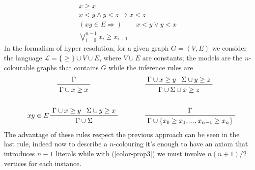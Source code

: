 \documentclass[a4paper,12pt,oneside]{book}
\let\o\vee
\let\e\wedge
\begin{document}
\begin{gather}
x\geq x\\
x<y \e y<z \rightarrow x<z \\
( xy \in E \Rightarrow ) \qquad  x<y \o y<x\\
\bigvee_{i=0}^{n-1} x_i\geq x_{i+1}
\end{gather}
In the formalism of hyper resolution, for a given graph $G=(V,E)$ we consider the language $\mathscr{L}=\{\geq\}\cup V\cup E$, where $V\cup E$ are constants; the models are the $n$-colourable graphs that contains $G$ while the inference rules are
\begin{align*}
\prftree{\Gamma}{\Gamma \cup x\geq x }\qquad \qquad\qquad
& \qquad\prftree{\Gamma\cup x\geq y}{ \Sigma\cup y\geq z }{\Gamma\cup\Sigma\cup x\geq z } \\
\,&\,\\
\prftree[l]{$\quad xy \in E $}{\Gamma \cup  x\geq y }{\Sigma \cup  y\geq x }
{ \Gamma\cup\Sigma} \qquad &\qquad \prftree{\Gamma}
{\Gamma\cup\{x_0\geq x_1 ,..., x_{n-1}\geq x_n \}}
\end{align*}
The advantage of these rules respect the previous approach can be seen in the last rule, indeed now to describe a $n$-colouring it's enough to have an axiom that introduces $n-1$ literals while with (\ref{color-prop3}) we must involve $n(n+1)/2$ vertices for each instance.
\end{document}
